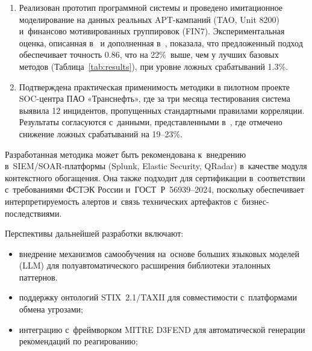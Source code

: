 \begin{enumerate}
    \item Реализован прототип программной системы и проведено имитационное моделирование на данных реальных APT-кампаний (TAO, Unit 8200) и~финансово мотивированных группировок (FIN7). Экспериментальная оценка, описанная в~\cite{inside2026} и дополненная в~\cite{Latypov2025}, показала, что предложенный подход обеспечивает точность 0.86, что на 22\%~выше, чем у лучших базовых методов (Таблица~\ref{tab:results}), при уровне ложных срабатываний 1.3\%.

    \item Подтверждена практическая применимость методики в пилотном проекте SOC-центра ПАО «Транснефть», где за три месяца тестирования система выявила 12 инцидентов, пропущенных стандартными правилами корреляции. Результаты согласуются с~данными, представленными в~\cite{Latypov2025}, где отмечено снижение ложных срабатываний на 19–23\%.
\end{enumerate}

Разработанная методика может быть рекомендована к~внедрению в~SIEM/SOAR-платформы (Splunk, Elastic Security, QRadar) в~качестве модуля контекстного обогащения. Она также подходит для сертификации в~соответствии с~требованиями ФСТЭК России и~ГОСТ~Р~56939–2024, поскольку обеспечивает интерпретируемость алертов и~связь технических артефактов с~бизнес-последствиями.

Перспективы дальнейшей разработки включают:
\begin{itemize}
    \item внедрение механизмов самообучения на~основе больших языковых моделей (LLM) для полуавтоматического расширения библиотеки эталонных паттернов.
    \item поддержку онтологий STIX~2.1/TAXII для совместимости с~платформами обмена угрозами;
    \item интеграцию с~фреймворком MITRE D3FEND для автоматической генерации рекомендаций по реагированию;
\end{itemize}
    